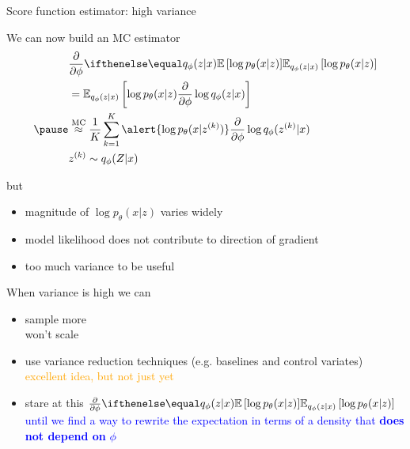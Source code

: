 \begin{frame}[plain]{Score function estimator: high variance}


We can now build an MC estimator
\begin{equation*}
\begin{aligned}
&\pdv{\phi}\E[q_\phi(z|x)]{\log p_\theta(x|z)} \\ 
&= \mathbb E_{q_\phi(z|x)} \left[  \log p_\theta(x|z)  \pdv{\phi}\log q_\phi(z|x)\right] \\ \pause 
&\overset{\text{MC}}{\approx} \frac{1}{K} \sum_{k=1}^K \alert{\log p_\theta(x|z^{(k)})} \pdv{\phi}\log q_\phi(z^{(k)}|x) \\
&z^{(k)} \sim q_\phi(Z|x)
\end{aligned}
\end{equation*}

\pause
but
\begin{itemize}
	\item magnitude of $\log p_\theta(x|z)$ varies widely \pause 
	\item model likelihood does not contribute to direction of gradient \pause
	\item too much variance to be useful
\end{itemize}

\end{frame}

\begin{frame}{When variance is high we can}

\begin{itemize}
	\item sample more \\ \pause
	\alert{won't scale} \pause
	\item use variance reduction techniques (e.g. baselines and control variates)\\ \pause 		\textcolor{orange}{excellent idea, but not just yet} \pause
	\item stare at this $\pdv{\phi}\E[q_\phi(z|x)]{\log p_\theta(x|z)}$ \\ \pause
	\textcolor{blue}{until we find a way to rewrite the expectation in terms of a density that 
	{\bf does not depend on} $\phi$}
\end{itemize}
\end{frame}

